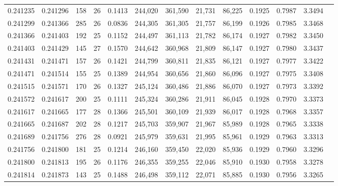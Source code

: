\begin{tabular}{rrrrrrrrrrrrr}
0.241235 & 0.241296 &   158 &  26 &                                     0.1413 & 244,020 & 361,590 &  21,731 &  86,225 & 0.1925 & 0.7987 & 3.3494 \\
0.241299 & 0.241366 &   285 &  26 &                                     0.0836 & 244,305 & 361,305 &  21,757 &  86,199 & 0.1926 & 0.7985 & 3.3468 \\
0.241366 & 0.241403 &   192 &  25 &                                     0.1152 & 244,497 & 361,113 &  21,782 &  86,174 & 0.1927 & 0.7982 & 3.3450 \\
0.241403 & 0.241429 &   145 &  27 &                                     0.1570 & 244,642 & 360,968 &  21,809 &  86,147 & 0.1927 & 0.7980 & 3.3437 \\
0.241431 & 0.241471 &   157 &  26 &                                     0.1421 & 244,799 & 360,811 &  21,835 &  86,121 & 0.1927 & 0.7977 & 3.3422 \\
0.241471 & 0.241514 &   155 &  25 &                                     0.1389 & 244,954 & 360,656 &  21,860 &  86,096 & 0.1927 & 0.7975 & 3.3408 \\
0.241515 & 0.241571 &   170 &  26 &                                     0.1327 & 245,124 & 360,486 &  21,886 &  86,070 & 0.1927 & 0.7973 & 3.3392 \\
0.241572 & 0.241617 &   200 &  25 &                                     0.1111 & 245,324 & 360,286 &  21,911 &  86,045 & 0.1928 & 0.7970 & 3.3373 \\
0.241617 & 0.241665 &   177 &  28 &                                     0.1366 & 245,501 & 360,109 &  21,939 &  86,017 & 0.1928 & 0.7968 & 3.3357 \\
0.241665 & 0.241687 &   202 &  28 &                                     0.1217 & 245,703 & 359,907 &  21,967 &  85,989 & 0.1928 & 0.7965 & 3.3338 \\
0.241689 & 0.241756 &   276 &  28 &                                     0.0921 & 245,979 & 359,631 &  21,995 &  85,961 & 0.1929 & 0.7963 & 3.3313 \\
0.241756 & 0.241800 &   181 &  25 &                                     0.1214 & 246,160 & 359,450 &  22,020 &  85,936 & 0.1929 & 0.7960 & 3.3296 \\
0.241800 & 0.241813 &   195 &  26 &                                     0.1176 & 246,355 & 359,255 &  22,046 &  85,910 & 0.1930 & 0.7958 & 3.3278 \\
0.241814 & 0.241873 &   143 &  25 &                                     0.1488 & 246,498 & 359,112 &  22,071 &  85,885 & 0.1930 & 0.7956 & 3.3265 \\

\end{tabular}
